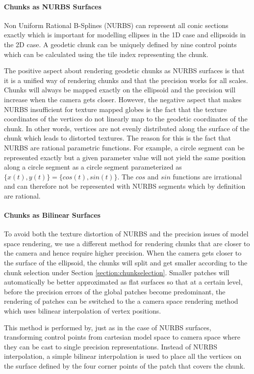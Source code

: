 \paragraph{Chunks as NURBS Surfaces}
Non Uniform Rational B-Splines (NURBS) can represent all conic sections exactly which is important for modelling ellipses in the 1D case and ellipsoids in the 2D case. A geodetic chunk can be uniquely defined by nine control points which can be calculated using the tile index representing the chunk.

The positive aspect about rendering geodetic chunks as NURBS surfaces is that it is a unified way of rendering chunks and that the precision works for all scales. Chunks will always be mapped exactly on the ellipsoid and the precision will increase when the camera gets closer. However, the negative aspect that makes NURBS insufficient for texture mapped globes is the fact that the texture coordinates of the vertices do not linearly map to the geodetic coordinates of the chunk. In other words, vertices are not evenly distributed along the surface of the chunk which leads to distorted textures. The reason for this is the fact that NURBS are rational parametric functions. For example, a circle segment can be represented exactly but a given parameter value will not yield the same position along a circle segment as a circle segment parameterized as $\{x(t),y(t)\} = \{cos(t), sin(t)\}$. The $cos$ and $sin$ functions are irrational and can therefore not be represented with NURBS segments which by definition are rational.

\paragraph{Chunks as Bilinear Surfaces}
To avoid both the texture distortion of NURBS and the precision issues of model space rendering, we use a different method for rendering chunks that are closer to the camera and hence require higher precision. When the camera gets closer to the surface of the ellipsoid, the chunks will split and get smaller according to the chunk selection under Section \ref{section:chunkselection}. Smaller patches will automatically be better approximated as flat surfaces so that at a certain level, before the precision errors of the global patches become predominant, the rendering of patches can be switched to the a camera space rendering method which uses bilinear interpolation of vertex positions.

This method is performed by, just as in the case of NURBS surfaces, transforming control points from cartesian model space to camera space where they can be cast to single precision representations. Instead of NURBS interpolation, a simple bilinear interpolation is used to place all the vertices on the surface defined by the four corner points of the patch that covers the chunk.

